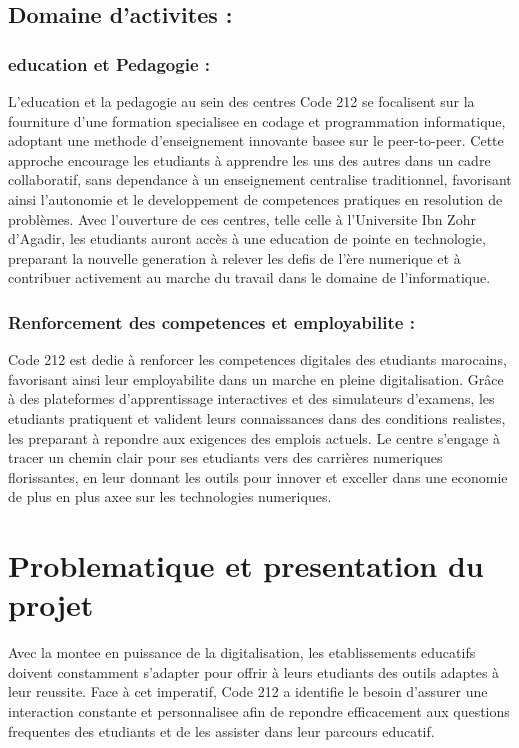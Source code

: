 \documentclass[a4paper, 11pt, openany]{report}
\begin{document}
\subsection{Domaine d'activites :}

\subsubsection{education et Pedagogie :}
L'education et la pedagogie au sein des centres Code 212 se focalisent sur la fourniture d'une formation specialisee en codage et programmation informatique, adoptant une methode d'enseignement innovante basee sur le peer-to-peer. Cette approche encourage les etudiants à apprendre les uns des autres dans un cadre collaboratif, sans dependance à un enseignement centralise traditionnel, favorisant ainsi l'autonomie et le developpement de competences pratiques en resolution de problèmes. Avec l'ouverture de ces centres, telle celle à l'Universite Ibn Zohr d'Agadir, les etudiants auront accès à une education de pointe en technologie, preparant la nouvelle generation à relever les defis de l'ère numerique et à contribuer activement au marche du travail dans le domaine de l'informatique.

\subsubsection{Renforcement des competences et employabilite :}
Code 212 est dedie à renforcer les competences digitales des etudiants marocains, favorisant ainsi leur employabilite dans un marche en pleine digitalisation. Grâce à des plateformes d'apprentissage interactives et des simulateurs d'examens, les etudiants pratiquent et valident leurs connaissances dans des conditions realistes, les preparant à repondre aux exigences des emplois actuels. Le centre s'engage à tracer un chemin clair pour ses etudiants vers des carrières numeriques florissantes, en leur donnant les outils pour innover et exceller dans une economie de plus en plus axee sur les technologies numeriques.



\section{Problematique et presentation du projet}
Avec la montee en puissance de la digitalisation, les etablissements educatifs doivent constamment s'adapter pour offrir à leurs etudiants des outils adaptes à leur reussite. Face à cet imperatif, Code 212 a identifie le besoin d'assurer une interaction constante et personnalisee afin de repondre efficacement aux questions frequentes des etudiants et de les assister dans leur parcours educatif.
\end{document}
